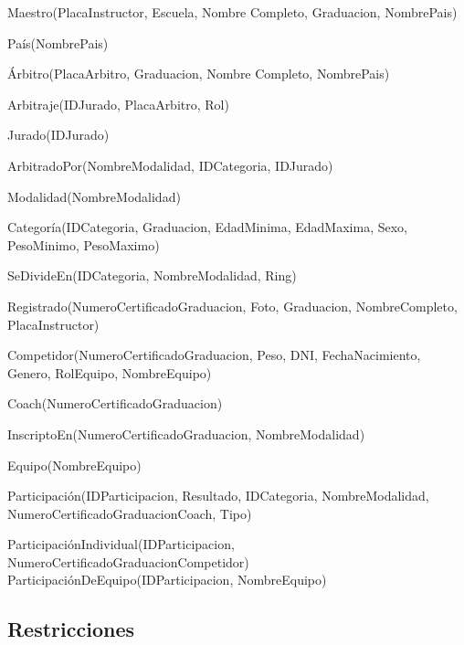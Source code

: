 \documentclass[a4paper]{article}
\begin{document}
Maestro(PlacaInstructor, Escuela, Nombre Completo, Graduacion, NombrePais)

País(NombrePais)

Árbitro(PlacaArbitro, Graduacion, Nombre Completo, NombrePais)

Arbitraje(IDJurado, PlacaArbitro, Rol)

Jurado(IDJurado)

ArbitradoPor(NombreModalidad, IDCategoria, IDJurado)

Modalidad(NombreModalidad)

Categoría(IDCategoria, Graduacion, EdadMinima, EdadMaxima, Sexo, PesoMinimo, PesoMaximo)

SeDivideEn(IDCategoria, NombreModalidad, Ring)

Registrado(NumeroCertificadoGraduacion, Foto,
Graduacion, NombreCompleto, PlacaInstructor)

Competidor(NumeroCertificadoGraduacion, Peso, DNI, FechaNacimiento, Genero, RolEquipo, NombreEquipo)

Coach(NumeroCertificadoGraduacion)

InscriptoEn(NumeroCertificadoGraduacion, NombreModalidad)

Equipo(NombreEquipo)

Participación(IDParticipacion, Resultado, IDCategoria, NombreModalidad, NumeroCertificadoGraduacionCoach, Tipo)

ParticipaciónIndividual(IDParticipacion, NumeroCertificadoGraduacionCompetidor)
ParticipaciónDeEquipo(IDParticipacion, NombreEquipo)

\subsection{Restricciones}
\end{document}
